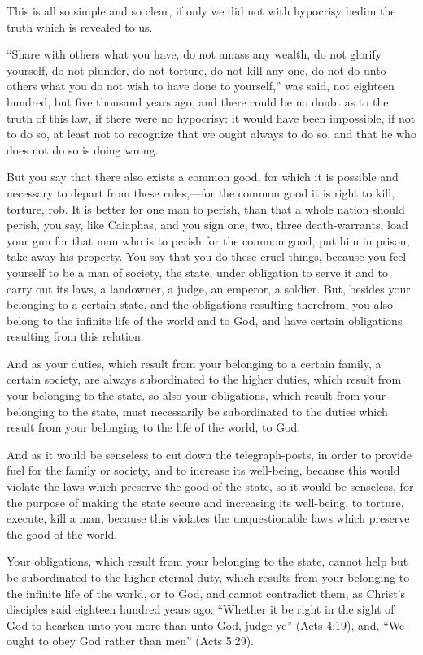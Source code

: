 \documentclass{book}
\begin{document}
This is all so simple and so clear, if only we did not with hypocrisy bedim the truth which is revealed to us.

“Share with others what you have, do not amass any wealth, do not glorify yourself, do not plunder, do not torture, do not kill any one, do not do unto others what you do not wish to have done to yourself,” was said, not eighteen hundred, but five thousand years ago, and there could be no doubt as to the truth of this law, if there were no hypocrisy: it would have been impossible, if not to do so, at least not to recognize that we ought always to do so, and that he who does not do so is doing wrong.

But you say that there also exists a common good, for which it is possible and necessary to depart from these rules,—for the common good it is right to kill, torture, rob. It is better for one man to perish, than that a whole nation should perish, you say, like Caiaphas, and you sign one, two, three death-warrants, load your gun for that man who is to perish for the common good, put him in prison, take away his property. You say that you do these cruel things, because you feel yourself to be a man of society, the state, under obligation to serve it and to carry out its laws, a landowner, a judge, an emperor, a soldier. But, besides your belonging to a certain state, and the obligations resulting therefrom, you also belong to the infinite life of the world and to God, and have certain obligations resulting from this relation.

And as your duties, which result from your belonging to a certain family, a certain society, are always subordinated to the higher duties, which result from your belonging to the state, so also your obligations, which result from your belonging to the state, must necessarily be subordinated to the duties which result from your belonging to the life of the world, to God.

And as it would be senseless to cut down the telegraph-posts, in order to provide fuel for the family or society, and to increase its well-being, because this would violate the laws which preserve the good of the state, so it would be senseless, for the purpose of making the state secure and increasing its well-being, to torture, execute, kill a man, because this violates the unquestionable laws which preserve the good of the world.

Your obligations, which result from your belonging to the state, cannot help but be subordinated to the higher eternal duty, which results from your belonging to the infinite life of the world, or to God, and cannot contradict them, as Christ’s disciples said eighteen hundred years ago: “Whether it be right in the sight of God to hearken unto you more than unto God, judge ye” (Acts 4:19), and, “We ought to obey God rather than men” (Acts 5:29).
\end{document}
